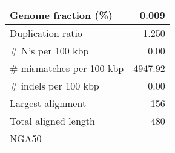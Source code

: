 \documentclass[12pt,a4paper]{article}
\begin{document}
\begin{table}[ht]
\begin{center}
\begin{tabular}{|l*{1}{|r}|}
Genome fraction (\%) & 0.009 \\ \hline
Duplication ratio & 1.250 \\ \hline
\# N's per 100 kbp & 0.00 \\ \hline
\# mismatches per 100 kbp & 4947.92 \\ \hline
\# indels per 100 kbp & 0.00 \\ \hline
Largest alignment & 156 \\ \hline
Total aligned length & 480 \\ \hline
NGA50 & - \\ \hline
\end{tabular}
\end{center}
\end{table}
\end{document}
